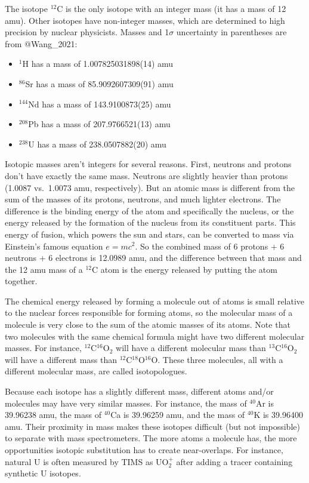 \documentclass[
  letterpaper,
  DIV=11,
  numbers=noendperiod]{scrreprt}
\providecommand{\tightlist}{%
  \setlength{\itemsep}{0pt}\setlength{\parskip}{0pt}}\usepackage{longtable,booktabs,array}
\begin{document}
The isotope \(^{12}\)C is the only isotope with an integer mass (it has
a mass of 12 amu). Other isotopes have non-integer masses, which are
determined to high precision by nuclear physicists. Masses and
1\(\sigma\) uncertainty in parentheses are from @Wang\_2021:

\begin{itemize}
\tightlist
\item
  \(^{1}\)H has a mass of 1.007825031898(14) amu
\item
  \(^{86}\)Sr has a mass of 85.9092607309(91) amu
\item
  \(^{144}\)Nd has a mass of 143.9100873(25) amu
\item
  \(^{208}\)Pb has a mass of 207.9766521(13) amu
\item
  \(^{238}\)U has a mass of 238.0507882(20) amu
\end{itemize}

Isotopic masses aren't integers for several reasons. First, neutrons and
protons don't have exactly the same mass. Neutrons are slightly heavier
than protons (1.0087 vs.~1.0073 amu, respectively). But an atomic mass
is different from the sum of the masses of its protons, neutrons, and
much lighter electrons. The difference is the binding energy of the atom
and specifically the nucleus, or the energy released by the formation of
the nucleus from its constituent parts. This energy of fusion, which
powers the sun and stars, can be converted to mass via Einstein's famous
equation \(e=mc^2\). So the combined mass of 6 protons + 6 neutrons + 6
electrons is 12.0989 amu, and the difference between that mass and the
12 amu mass of a \(^{12}\)C atom is the energy released by putting the
atom together.

The chemical energy released by forming a molecule out of atoms is small
relative to the nuclear forces responsible for forming atoms, so the
molecular mass of a molecule is very close to the sum of the atomic
masses of its atoms. Note that two molecules with the same chemical
formula might have two different molecular masses. For instance,
\(^{12}\)C\(^{16}\)O\(_2\) will have a different molecular mass than
\(^{13}\)C\(^{16}\)O\(_2\) will have a different mass than
\(^{12}\)C\(^{18}\)O\(^{16}\)O. These three molecules, all with a
different molecular mass, are called isotopologues.

Because each isotope has a slightly different mass, different atoms
and/or molecules may have very similar masses. For instance, the mass of
\(^{40}\)Ar is 39.96238 amu, the mass of \(^{40}\)Ca is 39.96259 amu,
and the mass of \(^{40}\)K is 39.96400 amu. Their proximity in mass
makes these isotopes difficult (but not impossible) to separate with
mass spectrometers. The more atoms a molecule has, the more
opportunities isotopic substitution has to create near-overlaps. For
instance, natural U is often measured by TIMS as UO\(^{+}_{2}\) after
adding a tracer containing synthetic U isotopes.
\end{document}
